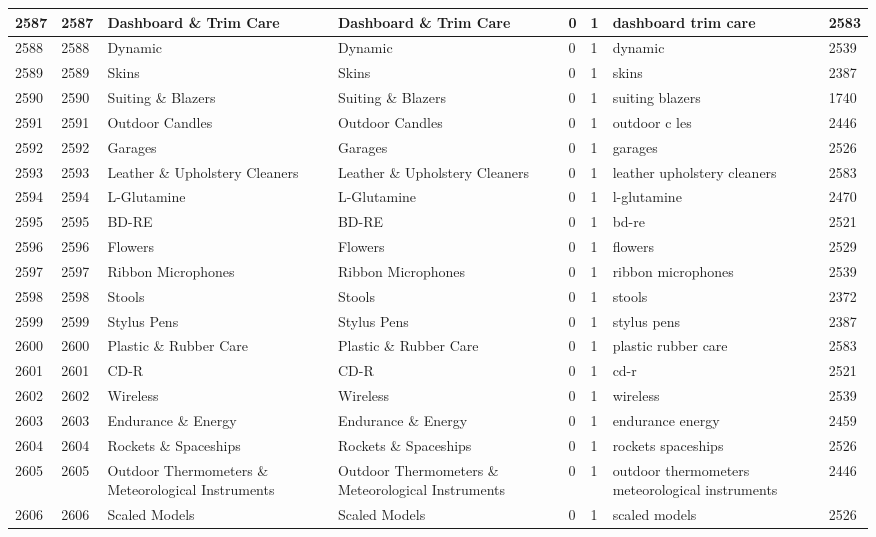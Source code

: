 \begin{longtable}{|l|l|l|l|l|l|l|l|}
2587 & 2587 & Dashboard \& Trim Care & Dashboard \& Trim Care & 0 & 1 & dashboard trim care & 2583 \\ \hline 
2588 & 2588 & Dynamic & Dynamic & 0 & 1 & dynamic & 2539 \\ \hline 
2589 & 2589 & Skins & Skins & 0 & 1 & skins & 2387 \\ \hline 
2590 & 2590 & Suiting \& Blazers & Suiting \& Blazers & 0 & 1 & suiting blazers & 1740 \\ \hline 
2591 & 2591 & Outdoor Candles & Outdoor Candles & 0 & 1 & outdoor c les & 2446 \\ \hline 
2592 & 2592 & Garages & Garages & 0 & 1 & garages & 2526 \\ \hline 
2593 & 2593 & Leather \& Upholstery Cleaners & Leather \& Upholstery Cleaners & 0 & 1 & leather upholstery cleaners & 2583 \\ \hline 
2594 & 2594 & L-Glutamine & L-Glutamine & 0 & 1 & l-glutamine & 2470 \\ \hline 
2595 & 2595 & BD-RE & BD-RE & 0 & 1 & bd-re & 2521 \\ \hline 
2596 & 2596 & Flowers & Flowers & 0 & 1 & flowers & 2529 \\ \hline 
2597 & 2597 & Ribbon Microphones & Ribbon Microphones & 0 & 1 & ribbon microphones & 2539 \\ \hline 
2598 & 2598 & Stools & Stools & 0 & 1 & stools & 2372 \\ \hline 
2599 & 2599 & Stylus Pens & Stylus Pens & 0 & 1 & stylus pens & 2387 \\ \hline 
2600 & 2600 & Plastic \& Rubber Care & Plastic \& Rubber Care & 0 & 1 & plastic rubber care & 2583 \\ \hline 
2601 & 2601 & CD-R & CD-R & 0 & 1 & cd-r & 2521 \\ \hline 
2602 & 2602 & Wireless & Wireless & 0 & 1 & wireless & 2539 \\ \hline 
2603 & 2603 & Endurance \& Energy & Endurance \& Energy & 0 & 1 & endurance energy & 2459 \\ \hline 
2604 & 2604 & Rockets \& Spaceships & Rockets \& Spaceships & 0 & 1 & rockets spaceships & 2526 \\ \hline 
2605 & 2605 & Outdoor Thermometers \& Meteorological Instruments & Outdoor Thermometers \& Meteorological Instruments & 0 & 1 & outdoor thermometers meteorological instruments & 2446 \\ \hline 
2606 & 2606 & Scaled Models & Scaled Models & 0 & 1 & scaled models & 2526 \\ \hline 

\end{longtable}
